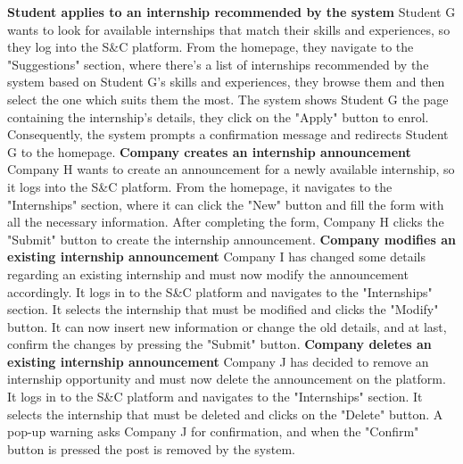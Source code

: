 \newline
\newline
\textbf{Student applies to an internship recommended by the system }\newline
Student G wants to look for available internships that match their skills and experiences, so they log into the S\&C platform. From the homepage, they navigate to the "Suggestions" section, where there's a list of internships recommended by the system based on Student G's skills and experiences, they browse them and then select the one which suits them the most.
The system shows Student G the page containing the internship's details, they click on the "Apply" button to enrol. Consequently, the system prompts a confirmation message and redirects Student G to the homepage.
\newline
\newline
\textbf{Company creates an internship announcement}\newline
Company H wants to create an announcement for a newly available internship, so it logs into the S\&C platform. From the homepage, it navigates to the "Internships" section, where it can click the "New" button and fill the form with all the necessary information. After completing the form, Company H clicks the "Submit" button to create the internship announcement.
\newline
\newline
\textbf{Company modifies an existing internship announcement}\newline
Company I has changed some details regarding an existing internship and must now modify the announcement accordingly. It logs in to the S\&C platform and navigates to the "Internships" section. It selects the internship that must be modified and clicks the "Modify" button. It can now insert new information or change the old details, and at last, confirm the changes by pressing the "Submit" button.
\newline
\newline
\textbf{Company deletes an existing internship announcement}\newline
Company J has decided to remove an internship opportunity and must now delete the announcement on the platform. It logs in to the S\&C platform and navigates to the "Internships" section. It selects the internship that must be deleted and clicks on the "Delete" button. A pop-up warning asks Company J for confirmation, and when the "Confirm" button is pressed the post is removed by the system.
\newline
